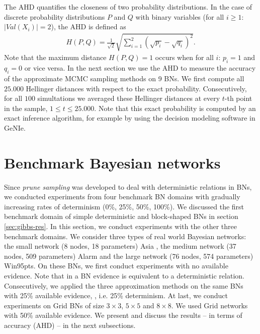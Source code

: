 \documentclass[a4paper, twoside, 11pt]{report}
\theoremstyle{plain}
\theoremstyle{definition}
\theoremstyle{remark}
\newcommand{\ps}{\textit{prune sampling }}
\begin{document}
The \gls{AHD} quantifies the closeness of two probability distributions. In the case of discrete probability distributions $P$ and $Q$ with binary variables (for all $i\geq 1$: $|Val(X_i)| = 2$), the AHD is defined as
\begin{align*}
H(P,Q) = \frac{1}{\sqrt{2}}\sqrt{ \sum_{i=1}^2 ( \sqrt{p_i} - \sqrt{q_i})^2 }.
\end{align*}
Note that the maximum distance $H(P,Q) = 1$ occurs when for all $i$: $p_i =1$ and $q_i = 0$ or vice versa. In the next section we use the AHD to measure the accuracy of the approximate MCMC sampling methods on 9 BNs. We first compute all $25.000$ Hellinger distances with respect to the exact probability. Consecutively, for all $100$ simultations we averaged these Hellinger distances at every $t$-th point in the sample, $1 \leq t \leq 25.000$. Note that this exact probability is computed by an exact inference algorithm, for example by using the decision modeling software in GeNIe. 

\section{Benchmark Bayesian networks}\label{BenchBNs}
Since \ps was developed to deal with deterministic relations in BNs, we conducted experiments from four benchmark BN domains with gradually increasing rates of determinism (0\%, 25\%, 50\%, 100\%). We discussed the first benchmark domain of simple deterministic and block-shaped BNs in section \ref{sec:gibbs-res}. In this section, we conduct experiments with the other three benchmark domains. We consider three types of real world Bayesian networks: the small network (8 nodes, 18 parameters) Asia \cite{lauritzen1988local}, the medium network (37 nodes, 509 parameters) Alarm \cite{beinlich1989alarm} and the large network (76 nodes, 574 parameters) Win95pts. On these BNs, we first conduct experiments with no available evidence. Note that in a BN evidence is equivalent to a deterministic relation. Consecutively, we applied the three approximation methods on the same BNs with 25\% available evidence, , i.e. 25\% determinism. At last, we conduct experiments on Grid BNs  \cite{sang2005solving} of size $3 \times 3$, $5 \times 5$ and $8 \times 8$. We used Grid networks with 50\% available evidence. We present and discuss the results -- in terms of accuracy (AHD) -- in the next subsections.
\end{document}
